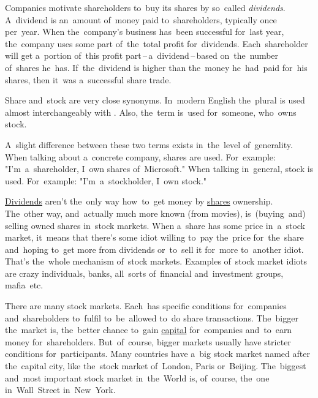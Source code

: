 Companies motivate shareholders to~buy its shares by so~called \textit{dividends}.
A~dividend is an~amount of~money paid to~shareholders, typically once per~year.
When the~company's business has~been successful for~last year, the~company uses some part of~the~total profit for~dividends.
Each~shareholder will get a~portion of~this profit part\,--\,a~dividend\,--\,based on~the~number of~shares he~has.
If~the~dividend is higher than the~money he~had~paid for~his shares, then it~was a~successful share trade.

Share and~stock are very close synonyms.
In~modern English the~plural  is used almost interchangeably with .
Also, the~term  is~used for~someone, who~owns stock.

A~slight difference between these two terms exists in~the~level of~generality.
When talking about a~concrete company, shares are used.
For~example:
"I'm~a~shareholder, I~own shares of~Microsoft."
When talking in~general, stock is used.
For~example:
"I'm~a~stockholder, I~own stock."

\hyperref[share]{Dividends} aren't the~only way how~to~get money by \hyperref[share]{shares} ownership.
The~other way, and~actually much more known (from movies), is~(buying~and) selling owned shares in~stock markets.
When a~share has some price in~a~stock market, it~means that there's some idiot willing to~pay the~price for~the~share and~hoping to~get more from dividends or~to~sell it for~more to~another idiot.
That's the~whole mechanism of~stock markets.
Examples of~stock market idiots are crazy individuals, banks, all~sorts of~financial and~investment groups, mafia~etc.

There are many stock markets.
Each~has specific conditions for~companies and~shareholders to~fulfil to~be~allowed to~do share transactions.
The~bigger the~market is, the~better chance to~gain \hyperref[capital]{capital} for~companies and~to~earn money for~shareholders.
But~of~course, bigger markets usually have stricter conditions for~participants.
Many countries have a~big stock market named after the~capital city, like the~stock market of~London, Paris or~Beijing.
The~biggest and~most important stock market in~the~World is, of~course, the~one in~Wall~Street in~New~York.
